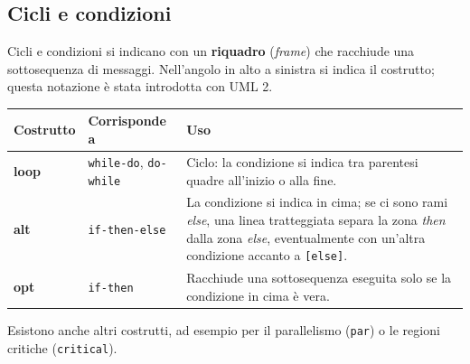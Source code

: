 
\subsection{Cicli e condizioni}

Cicli e condizioni si indicano con un \textbf{riquadro} (\textit{frame}) che racchiude una sottosequenza di messaggi. Nell'angolo
in alto a sinistra si indica il costrutto; questa notazione è stata introdotta con UML 2.

\begin{table}[H]
\centering
\renewcommand{\arraystretch}{1.4}
\begin{tabularx}{\textwidth}{>{\bfseries\ttfamily}P{1.4cm} P{2.6cm} L}
\toprule
\normalfont\textbf{Costrutto} & \textbf{Corrisponde a} & \textbf{Uso} \\
\midrule
loop & \texttt{while-do}, \texttt{do-while} & Ciclo: la condizione si indica tra parentesi quadre all'inizio o alla fine. \\
alt & \texttt{if-then-else} & La condizione si indica in cima; se ci sono rami \textit{else}, una linea tratteggiata separa la zona
\textit{then} dalla zona \textit{else}, eventualmente con un'altra condizione accanto a \texttt{[else]}. \\
opt & \texttt{if-then} & Racchiude una sottosequenza eseguita solo se la condizione in cima è vera. \\
\bottomrule
\end{tabularx}
\end{table}

Esistono anche altri costrutti, ad esempio per il parallelismo (\texttt{par}) o le regioni critiche (\texttt{critical}).

